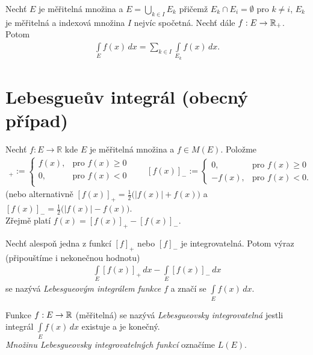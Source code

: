 \begin{theorem}
Nechť $E$ je měřitelná množina a $E=\bigcup \limits _{k \in I} E_k$ přičemž $E_k \cap E_i = \emptyset$ pro $k \neq i$, $E_k$ je měřitelná a indexová množina $I$ nejvíc spočetná. Nechť dále $f:E \to \mathbb{R}_+$. Potom
\begin{align*}
\int \limits _E f(x) \, dx = \sum \limits _{k \in I} \int \limits _{E_k} f(x) \, dx.
\end{align*}
\end{theorem}


\section{Lebesgueův integrál (obecný případ)}


Nechť $f:E \to \mathbb{R}$ kde $E$ je měřitelná množina a $f \in M(E)$. Položme
\begin{align*}
  [f(x)]_+:=\begin{cases}
    f(x), & \text{pro $f(x) \geq 0$}\\
    0, & \text{pro $f(x)<0$} \\
  \end{cases} 
  \qquad
    [f(x)]_-:=\begin{cases}
    0, & \text{pro $f(x) \geq 0$}\\
    -f(x), & \text{pro $f(x)<0$}. 
  \end{cases}
\end{align*}
(nebo alternativně $[f(x)]_+=\frac{1}{2}\Big(|f(x)|+f(x)\Big)$ a $[f(x)]_-=\frac{1}{2}\Big(|f(x)|-f(x)\Big)$. \\
Zřejmě platí $f(x)=[f(x)]_+-[f(x)]_-$.

\begin{definition}
Nechť alespoň jedna z funkcí $[f]_+$ nebo $[f]_-$ je integrovatelná. Potom výraz (připouštíme i nekonečnou hodnotu)
\begin{align*}
\int \limits _E [f(x)]_+ \,dx - \int \limits _E [f(x)]_- \,dx 
\end{align*}
se nazývá \textit{Lebesgueovým integrálem funkce $f$} a značí se $\int \limits _E f(x) \, dx$.
\end{definition}


\begin{definition}
\label{d_2.14_Lebesgueovsky_integrovatelne_funkce}
Funkce $f:E \to \mathbb{R}$ (měřitelná) se nazývá \textit{Lebesgueovsky integrovatelná} jestli integrál $\int \limits _E f(x) \, dx$ existuje a je konečný. \\
\textit{Množinu Lebesgueovsky integrovatelných funkcí} označíme $L(E)$.
\end{definition}





